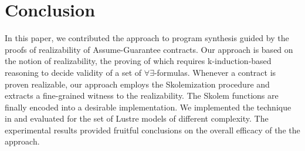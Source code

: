 \section{Conclusion}
\label{sec:conclusion}
In  this paper, we contributed the approach to program synthesis guided by the proofs of realizability of Assume-Guarantee contracts.
Our approach is based on the notion of realizability, the proving of which requires k-induction-based reasoning to decide validity of a set of $\forall\exists$-formulas.
Whenever a contract is proven realizable, our approach employs the Skolemization procedure and extracts a fine-grained witness to the realizability.
The Skolem functions are finally encoded into a desirable implementation.
We implemented the technique in \jkind and evaluated for the set of
Lustre models of different complexity.
The experimental results provided fruitful conclusions on the overall efficacy of the the approach.
